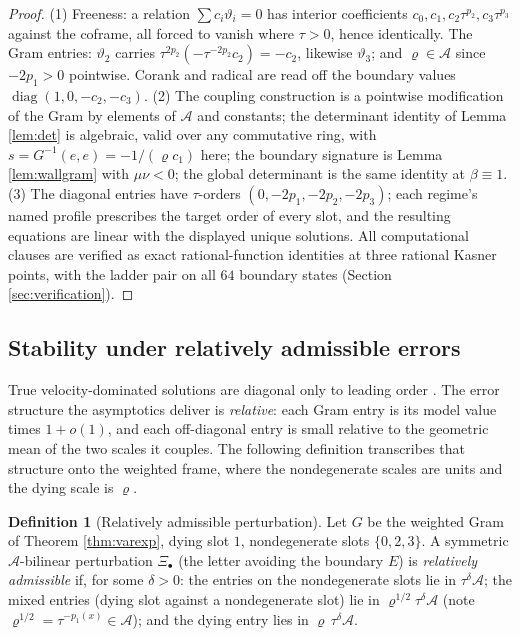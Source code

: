 \documentclass[11pt]{article}
\theoremstyle{definition}
\newtheorem{definition}[theorem]{Definition}
\begin{document}
\begin{proof}
(1) Freeness: a relation $\sum c_i\vartheta_i = 0$ has interior coefficients $c_0, c_1, c_2\tau^{p_2}, c_3\tau^{p_3}$ against the coframe, all forced to vanish where $\tau > 0$, hence identically. The Gram entries: $\vartheta_2$ carries $\tau^{2p_2}(-\tau^{-2p_2}c_2) = -c_2$, likewise $\vartheta_3$; and $\varrho \in \mathcal{A}$ since $-2p_1 > 0$ pointwise. Corank and radical are read off the boundary values $\operatorname{diag}(1, 0, -c_2, -c_3)$. (2) The coupling construction is a pointwise modification of the Gram by elements of $\mathcal{A}$ and constants; the determinant identity of Lemma \ref{lem:det} is algebraic, valid over any commutative ring, with $s = G^{-1}(e,e) = -1/(\varrho c_1)$ here; the boundary signature is Lemma \ref{lem:wallgram} with $\mu\nu < 0$; the global determinant is the same identity at $\beta \equiv 1$. (3) The diagonal entries have $\tau$-orders $(0, -2p_1, -2p_2, -2p_3)$; each regime's named profile prescribes the target order of every slot, and the resulting equations are linear with the displayed unique solutions. All computational clauses are verified as exact rational-function identities at three rational Kasner points, with the ladder pair on all $64$ boundary states (Section \ref{sec:verification}).
\end{proof}

\subsection{Stability under relatively admissible errors}\label{subsec:stability}

True velocity-dominated solutions are diagonal only to leading order \cite{IsenbergMoncrief1990}. The error structure the asymptotics deliver is \emph{relative}: each Gram entry is its model value times $1 + o(1)$, and each off-diagonal entry is small relative to the geometric mean of the two scales it couples. The following definition transcribes that structure onto the weighted frame, where the nondegenerate scales are units and the dying scale is $\varrho$.

\begin{definition}[Relatively admissible perturbation]\label{def:reladm}
Let $G$ be the weighted Gram of Theorem \ref{thm:varexp}, dying slot $1$, nondegenerate slots $\{0,2,3\}$. A symmetric $\mathcal{A}$-bilinear perturbation $\Xi_\bullet$ (the letter avoiding the boundary $E$) is \emph{relatively admissible} if, for some $\delta > 0$: the entries on the nondegenerate slots lie in $\tau^\delta\mathcal{A}$; the mixed entries (dying slot against a nondegenerate slot) lie in $\varrho^{1/2}\tau^\delta\mathcal{A}$ (note $\varrho^{1/2} = \tau^{-p_1(x)} \in \mathcal{A}$); and the dying entry lies in $\varrho\,\tau^\delta\mathcal{A}$.
\end{definition}
\end{document}
